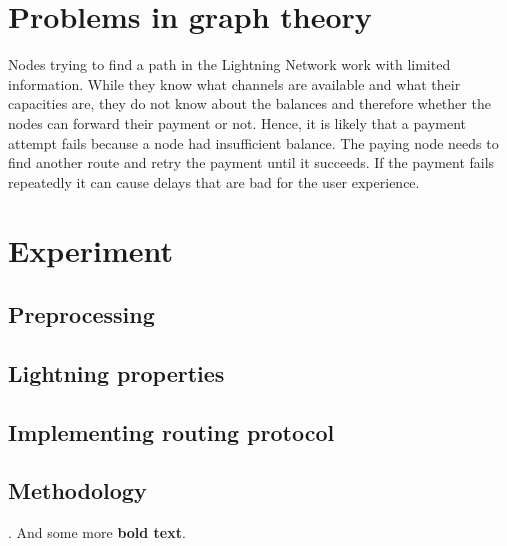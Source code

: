 \documentclass[final]{fhnwreport}       %
\begin{document}
\section{Problems in graph theory}

Nodes trying to find a path in the Lightning Network work with limited information. While they know what channels are available and what their capacities are, they do not know about the balances and therefore whether the nodes can forward their payment or not. Hence, it is likely that a payment attempt fails because a node had insufficient balance. The paying node needs to find another route and retry the payment until it succeeds. If the payment fails repeatedly it can cause delays that are bad for the user experience. 

\section{Experiment} \label{sec:method}
\subsection{Preprocessing}

\subsection{Lightning properties}

\subsection{Implementing routing protocol}

\subsection{Methodology}
. And some more \textbf{bold text}.
\end{document}
